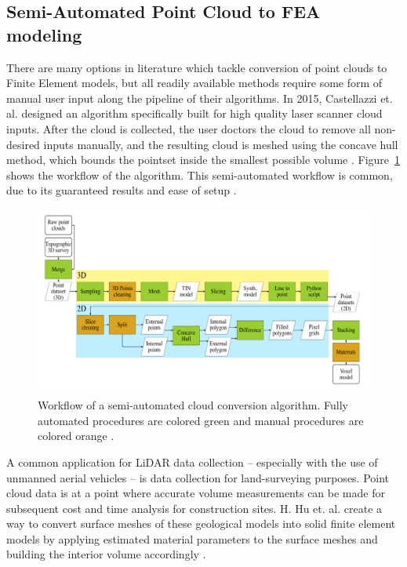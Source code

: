 \documentclass[12pt]{drexelthesis}
\let\Oldsubsection\subsection
\renewcommand{\subsection}{\FloatBarrier\Oldsubsection}
\begin{document}
\subsection{Semi-Automated Point Cloud to FEA modeling}
\label{subsec:SemiFEA}
There are many options in literature which tackle conversion of point clouds to Finite Element models, but all readily available methods require some form of manual user input along the pipeline of their algorithms.  
In 2015, Castellazzi et. al. designed an algorithm specifically built for high quality laser scanner cloud inputs. After the cloud is collected, the user doctors the cloud to remove all non-desired inputs manually, and the resulting cloud is meshed using the concave hull method, which bounds the pointset inside the smallest possible volume \cite{RN29}. Figure~\ref{fig:cloud2femworkflow} shows the workflow of the algorithm. This semi-automated workflow is common, due to its guaranteed results and ease of setup \cite{RN31,RN54}.

\begin{figure}
	\centering
	\includegraphics[width=5in]{introduction/cloud2femworkflow.png}
	\caption[Workflow of a semi-automated cloud conversion algorithm]{\centering Workflow of a semi-automated cloud conversion algorithm. Fully automated procedures are colored green and manual procedures are colored orange \cite{RN29}.}
	\label{fig:cloud2femworkflow}
\end{figure}



A common application for LiDAR data collection -- especially with the use of unmanned aerial vehicles -- is data collection for land-surveying purposes. Point cloud data is at a point where accurate volume measurements can be made for subsequent cost and time analysis for construction sites. H. Hu et. al. create a way to convert surface meshes of these geological models into solid finite element models by applying estimated material parameters to the surface meshes and building the interior volume accordingly \cite{RN38}.
\end{document}
